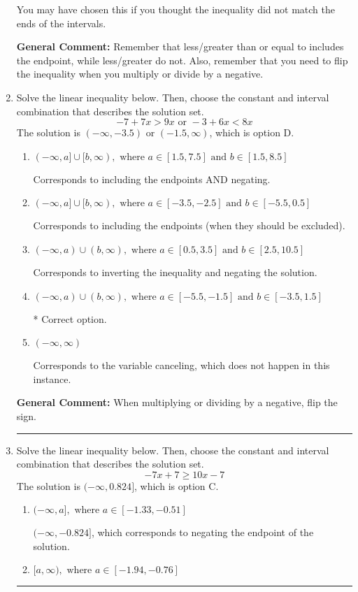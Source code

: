 \documentclass{extbook}[14pt]
\newcommand{\litem}[1]{\item #1

\rule{\textwidth}{0.4pt}}
\begin{document}
\begin{enumerate}
{\begin{enumerate}[label=\Alph*.]
You may have chosen this if you thought the inequality did not match the ends of the intervals.
\end{enumerate}

\textbf{General Comment:} Remember that less/greater than or equal to includes the endpoint, while less/greater do not. Also, remember that you need to flip the inequality when you multiply or divide by a negative.
}
\litem{
Solve the linear inequality below. Then, choose the constant and interval combination that describes the solution set.
\[ -7 + 7 x > 9 x \text{ or } -3 + 6 x < 8 x \]
The solution is \( (-\infty, -3.5) \text{ or } (-1.5, \infty) \), which is option D.\begin{enumerate}[label=\Alph*.]
\item \( (-\infty, a] \cup [b, \infty), \text{ where } a \in [1.5, 7.5] \text{ and } b \in [1.5, 8.5] \)

Corresponds to including the endpoints AND negating.
\item \( (-\infty, a] \cup [b, \infty), \text{ where } a \in [-3.5, -2.5] \text{ and } b \in [-5.5, 0.5] \)

Corresponds to including the endpoints (when they should be excluded).
\item \( (-\infty, a) \cup (b, \infty), \text{ where } a \in [0.5, 3.5] \text{ and } b \in [2.5, 10.5] \)

Corresponds to inverting the inequality and negating the solution.
\item \( (-\infty, a) \cup (b, \infty), \text{ where } a \in [-5.5, -1.5] \text{ and } b \in [-3.5, 1.5] \)

 * Correct option.
\item \( (-\infty, \infty) \)

Corresponds to the variable canceling, which does not happen in this instance.
\end{enumerate}

\textbf{General Comment:} When multiplying or dividing by a negative, flip the sign.
}
\litem{
Solve the linear inequality below. Then, choose the constant and interval combination that describes the solution set.
\[ -7x + 7 \geq 10x -7 \]
The solution is \( (-\infty, 0.824] \), which is option C.\begin{enumerate}[label=\Alph*.]
\item \( (-\infty, a], \text{ where } a \in [-1.33, -0.51] \)

 $(-\infty, -0.824]$, which corresponds to negating the endpoint of the solution.
\item \( [a, \infty), \text{ where } a \in [-1.94, -0.76] \)


\end{enumerate}}
\end{enumerate}
\end{document}
